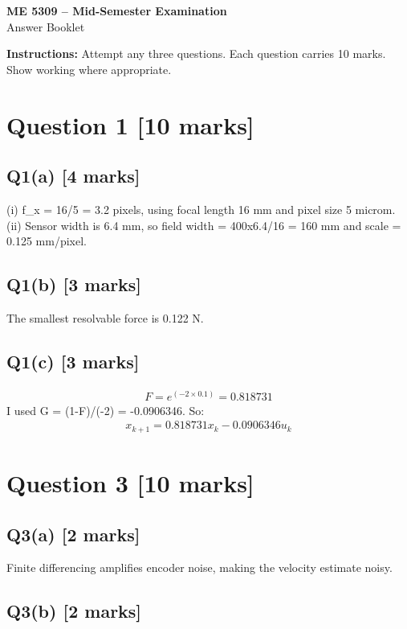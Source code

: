 \documentclass[11pt,a4paper]{article}
\begin{document}
\begin{center}
{\Large\bfseries ME 5309 -- Mid-Semester Examination}\\[3pt]
{\large Answer Booklet}\\[8pt]
\end{center}
\textbf{Instructions:} Attempt any three questions. Each question carries 10 marks. Show working where appropriate.
\section*{Question 1 \hfill [10 marks]}
\subsection*{Q1(a) \hfill [4 marks]}

(i) f\_x = 16/5 = 3.2 pixels, using focal length 16 mm and pixel size 5 microm.
(ii) Sensor width is 6.4 mm, so field width = 400x6.4/16 = 160 mm and scale = 0.125 mm/pixel.

\subsection*{Q1(b) \hfill [3 marks]}

The smallest resolvable force is 0.122 N.

\subsection*{Q1(c) \hfill [3 marks]}

\[\begin{aligned}F = e^(-2\times0.1) = 0.818731\end{aligned}\]
I used G = (1-F)/(-2) = -0.0906346.
So:\[\begin{aligned}x_{k+1} = 0.818731x_k - 0.0906346u_k\end{aligned}\]

\section*{Question 3 \hfill [10 marks]}
\subsection*{Q3(a) \hfill [2 marks]}

Finite differencing amplifies encoder noise, making the velocity estimate noisy.

\subsection*{Q3(b) \hfill [2 marks]}
\end{document}
